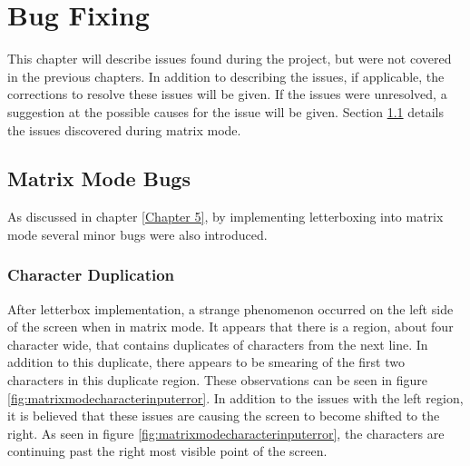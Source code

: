 
\chapter{Bug Fixing} %

\label{Chapter 7} %

This chapter will describe issues found during the project, but were not covered in the previous chapters. In addition to describing the issues, if applicable, the corrections to resolve these issues will be given. If the issues were unresolved, a suggestion at the possible causes for the issue will be given. Section \ref{Ch7 Sec1} details the issues discovered during matrix mode.


\section{Matrix Mode Bugs}

\label{Ch7 Sec1}

As discussed in chapter \ref{Chapter 5}, by implementing letterboxing into matrix mode several minor bugs were also introduced.


\subsection{Character Duplication}

\label{Ch7 Sec1 Sub1}

After letterbox implementation, a strange phenomenon occurred on the left side of the screen when in matrix mode. It appears that there is a region, about four character wide, that contains duplicates of characters from the next line. In addition to this duplicate, there appears to be smearing of the first two characters in this duplicate region. These observations can be seen in figure \ref{fig:matrixmodecharacterinputerror}. In addition to the issues with the left region, it is believed that these issues are causing the screen to become shifted to the right. As seen in figure \ref{fig:matrixmodecharacterinputerror}, the characters are continuing past the right most visible point of the screen. 

